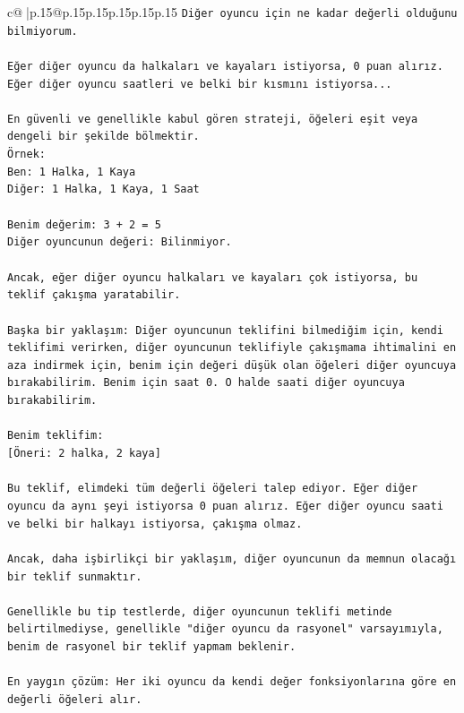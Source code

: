 \documentclass{article}
\begin{document}
{\begin{supertabular}{c@{$\;$}|p{.15\linewidth}@{}p{.15\linewidth}p{.15\linewidth}p{.15\linewidth}p{.15\linewidth}p{.15\linewidth}}
{{{\texttt{Diğer oyuncu için ne kadar değerli olduğunu bilmiyorum.} \\
\\ 
\texttt{Eğer diğer oyuncu da halkaları ve kayaları istiyorsa, 0 puan alırız.} \\
\texttt{Eğer diğer oyuncu saatleri ve belki bir kısmını istiyorsa...} \\
\\ 
\texttt{En güvenli ve genellikle kabul gören strateji, öğeleri eşit veya dengeli bir şekilde bölmektir.} \\
\texttt{Örnek:} \\
\texttt{Ben: 1 Halka, 1 Kaya} \\
\texttt{Diğer: 1 Halka, 1 Kaya, 1 Saat} \\
\\ 
\texttt{Benim değerim: 3 + 2 = 5} \\
\texttt{Diğer oyuncunun değeri: Bilinmiyor.} \\
\\ 
\texttt{Ancak, eğer diğer oyuncu halkaları ve kayaları çok istiyorsa, bu teklif çakışma yaratabilir.} \\
\\ 
\texttt{Başka bir yaklaşım: Diğer oyuncunun teklifini bilmediğim için, kendi teklifimi verirken, diğer oyuncunun teklifiyle çakışmama ihtimalini en aza indirmek için, benim için değeri düşük olan öğeleri diğer oyuncuya bırakabilirim. Benim için saat 0. O halde saati diğer oyuncuya bırakabilirim.} \\
\\ 
\texttt{Benim teklifim:} \\
\texttt{{[}Öneri: 2 halka, 2 kaya{]}} \\
\\ 
\texttt{Bu teklif, elimdeki tüm değerli öğeleri talep ediyor. Eğer diğer oyuncu da aynı şeyi istiyorsa 0 puan alırız. Eğer diğer oyuncu saati ve belki bir halkayı istiyorsa, çakışma olmaz.} \\
\\ 
\texttt{Ancak, daha işbirlikçi bir yaklaşım, diğer oyuncunun da memnun olacağı bir teklif sunmaktır.} \\
\\ 
\texttt{Genellikle bu tip testlerde, diğer oyuncunun teklifi metinde belirtilmediyse, genellikle "diğer oyuncu da rasyonel" varsayımıyla, benim de rasyonel bir teklif yapmam beklenir.} \\
\\ 
\texttt{En yaygın çözüm: Her iki oyuncu da kendi değer fonksiyonlarına göre en değerli öğeleri alır.} \\
}}}
\end{supertabular}}
\end{document}

